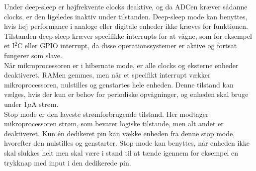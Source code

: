 Under deep-sleep er højfrekvente clocks deaktive, og da ADCen kræver sådanne clocks, er den ligeledes inaktiv under tilstanden. Deep-sleep mode kan benyttes, hvis høj performance i analoge eller digitale enheder ikke kræves for funktionen. Tilstanden deep-sleep kræver specifikke interrupts for at vågne, som for eksempel et I$^{2}$C eller GPIO interrupt, da disse operationssystemer er aktive og fortsat fungerer som slave. \citep{Semiconductor2016PowerMode} \\
Når mikroprocessoren er i hibernate mode, er alle clocks og eksterne enheder deaktiveret. RAMen gemmes, men når et specifikt interrupt vækker mikroprocessoren, nulstilles og genstartes hele enheden. Denne tilstand kan vælges, hvis der kun er behov for periodiske opvågninger, og enheden skal bruge under 1$\mu$A strøm. \citep{Semiconductor2016PowerMode} \\
Stop mode er den laveste strømforbrugende tilstand. Her modtager mikroprocessoren strøm, som bevarer logiske tilstande, men alt andet er deaktiveret. Kun én dedikeret pin kan vække enheden fra denne stop mode, hvorefter den nulstilles og genstarter. Stop mode kan benyttes, når enheden ikke skal slukkes helt men skal være i stand til at tænde igennem for eksempel en trykknap med input i den dedikerede pin. \citep{Semiconductor2016PowerMode}

